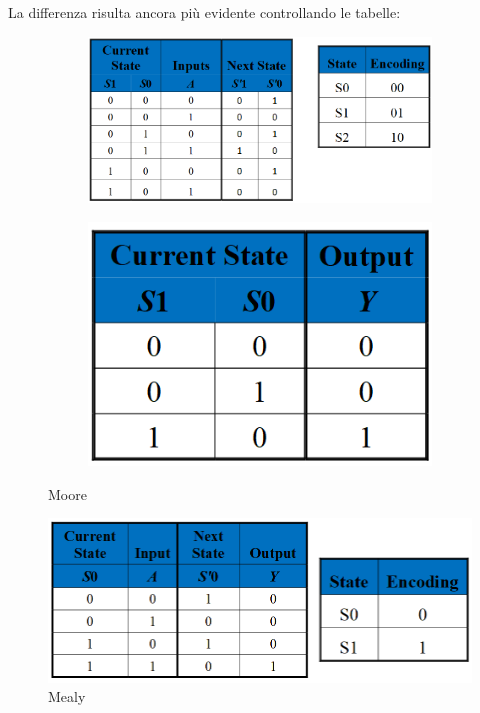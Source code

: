\documentclass{article}
\begin{document}
\newpage

La differenza risulta ancora più evidente controllando le tabelle:

    \begin{figure}[ht]
    \begin{minipage}[t]{0.49\textwidth}
        \centering
        \begin{figure}[H]
        \centering
        \includegraphics[width=1.1\linewidth]{moore_fsm.png}
        \end{figure}
        \label{fig:moore1}
    \end{minipage}
    \begin{minipage}[t]{0.49\textwidth}
    \centering
    \begin{figure}[H]
    \centering
    \includegraphics[width=.6\linewidth]{moore_fsm2.png}
    \end{figure}
    \label{fig:moore2}
    \end{minipage}
    \caption{Moore}
    \end{figure}

\begin{figure}[ht]
    \centering
    \includegraphics[width=.7\linewidth]{mealy_fsm.png}
    \caption{Mealy}
    \label{fig:mealy}
\end{figure}
\end{document}
